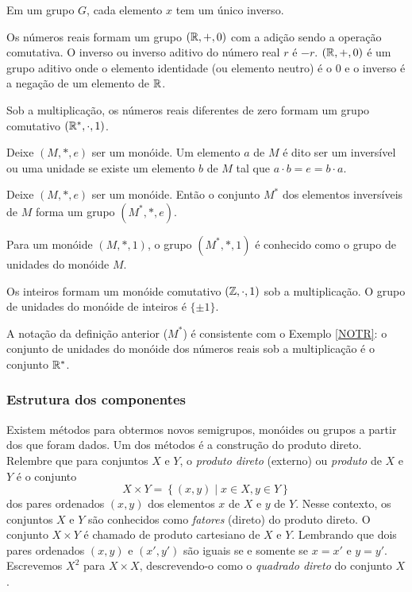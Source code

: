 \begin{stat}
  Em um grupo $G$, cada elemento $x$ tem um único inverso.
\end{stat}
\begin{exmp}
  Os números reais formam um grupo $(\mathbb{R},+,0)$ com a adição sendo a operação comutativa. O inverso ou inverso aditivo do número real $r$ é $-r$. $(\mathbb{R},+,0)$ é um grupo aditivo onde o elemento identidade (ou elemento neutro) é o $0$ e o inverso é a negação de um elemento de $\mathbb{R}$.
\end{exmp}
\begin{exmp}\label{NOTR}
  Sob a multiplicação, os números reais diferentes de zero formam um grupo comutativo $(\mathbb{R}^{*},\cdot , 1)$.
\end{exmp}
\begin{definition}
  Deixe $(M,*,e)$ ser um monóide. Um elemento $a$ de $M$ é dito ser um inversível ou uma unidade se existe um elemento $b$ de $M$ tal que $a\cdot b = e = b\cdot a$.
\end{definition}
\begin{stat}
  Deixe $(M,*,e)$ ser um monóide. Então o conjunto $M^*$ dos elementos inversíveis de $M$ forma um grupo $(M^*,*,e)$.
\end{stat}
\begin{definition}
  Para um monóide $(M,*,1)$, o grupo $(M^*,*,1)$ é conhecido como o grupo de unidades do monóide $M$.
\end{definition}
\begin{exmp}
  Os inteiros formam um monóide comutativo $(\mathbb{Z},\cdot , 1)$ sob a multiplicação. O grupo de unidades do monóide de inteiros é $\{\pm 1\}$.
\end{exmp}
\begin{exmp}
  A notação da definição anterior ($M^*$) é consistente com o Exemplo \ref{NOTR}: o conjunto de unidades do monóide dos números reais sob a multiplicação é o conjunto $\mathbb{R}^*$.
\end{exmp}

\subsubsection{Estrutura dos componentes}
Existem métodos para obtermos novos semigrupos, monóides ou grupos a partir dos que foram dados. Um dos métodos é a construção do produto direto. Relembre que para conjuntos $X$ e $Y$, o \emph{produto direto} (externo) ou \emph{produto} de $X$ e $Y$ é o conjunto
$$X \times Y = \left\{(x,y) \mid x \in X , y \in Y\right\}$$ dos pares ordenados $(x,y)$ dos elementos $x$ de $X$ e $y$ de $Y$. Nesse contexto, os conjuntos $X$ e $Y$ são conhecidos como \emph{fatores} (direto) do produto direto. O conjunto $X\times Y$ é chamado de produto cartesiano de $X$ e $Y$. Lembrando que dois pares ordenados $(x,y)$ e $(x',y')$ são iguais se e somente se $x=x'$ e $y=y'$. Escrevemos $X^{2}$ para $X\times X$, descrevendo-o como o \emph{quadrado direto} do conjunto $X$.

